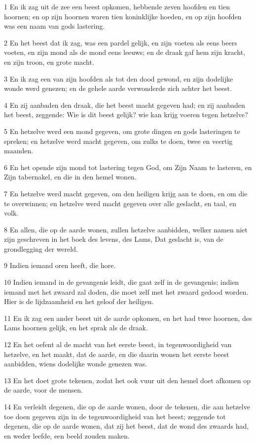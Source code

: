 \par 1 En ik zag uit de zee een beest opkomen, hebbende zeven hoofden en tien hoornen; en op zijn hoornen waren tien koninklijke hoeden, en op zijn hoofden was een naam van gods lastering.
\par 2 En het beest dat ik zag, was een pardel gelijk, en zijn voeten als eens beers voeten, en zijn mond als de mond eens leeuws; en de draak gaf hem zijn kracht, en zijn troon, en grote macht.
\par 3 En ik zag een van zijn hoofden als tot den dood gewond, en zijn dodelijke wonde werd genezen; en de gehele aarde verwonderde zich achter het beest.
\par 4 En zij aanbaden den draak, die het beest macht gegeven had; en zij aanbaden het beest, zeggende: Wie is dit beest gelijk? wie kan krijg voeren tegen hetzelve?
\par 5 En hetzelve werd een mond gegeven, om grote dingen en gods lasteringen te spreken; en hetzelve werd macht gegeven, om zulks te doen, twee en veertig maanden.
\par 6 En het opende zijn mond tot lastering tegen God, om Zijn Naam te lasteren, en Zijn tabernakel, en die in den hemel wonen.
\par 7 En hetzelve werd macht gegeven, om den heiligen krijg aan te doen, en om die te overwinnen; en hetzelve werd macht gegeven over alle geslacht, en taal, en volk.
\par 8 En allen, die op de aarde wonen, zullen hetzelve aanbidden, welker namen niet zijn geschreven in het boek des levens, des Lams, Dat geslacht is, van de grondlegging der wereld.
\par 9 Indien iemand oren heeft, die hore.
\par 10 Indien iemand in de gevangenis leidt, die gaat zelf in de gevangenis; indien iemand met het zwaard zal doden, die moet zelf met het zwaard gedood worden. Hier is de lijdzaamheid en het geloof der heiligen.
\par 11 En ik zag een ander beest uit de aarde opkomen, en het had twee hoornen, des Lams hoornen gelijk, en het sprak als de draak.
\par 12 En het oefent al de macht van het eerste beest, in tegenwoordigheid van hetzelve, en het maakt, dat de aarde, en die daarin wonen het eerste beest aanbidden, wiens dodelijke wonde genezen was.
\par 13 En het doet grote tekenen, zodat het ook vuur uit den hemel doet afkomen op de aarde, voor de mensen.
\par 14 En verleidt degenen, die op de aarde wonen, door de tekenen, die aan hetzelve toe doen gegeven zijn in de tegenwoordigheid van het beest; zeggende tot degenen, die op de aarde wonen, dat zij het beest, dat de wond des zwaards had, en weder leefde, een beeld zouden maken.
